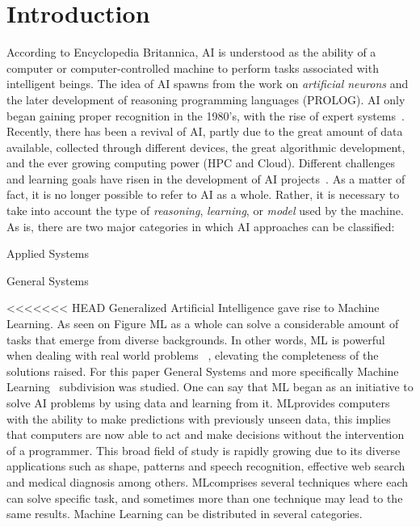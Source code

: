 
\section{Introduction}
\label{sec:introduction}

According to Encyclopedia Britannica, \ac{AI} is understood as the ability of a computer or 
computer-controlled machine to perform tasks associated with intelligent beings. The idea of 
\ac{AI} spawns from the work on \textit{artificial neurons} and the later development of reasoning 
programming languages (\eg PROLOG). \ac{AI} only began gaining proper recognition in the 
1980's, with the rise of expert systems~\cite{russel09}.  Recently, there has been a revival of 
\ac{AI}, partly due to the great amount of data available, collected through different devices, the 
great algorithmic development, and the ever growing computing power (\ie \ac{HPC} and Cloud). 
Different challenges and learning goals have risen in the development of \ac{AI} 
projects~\cite{russel09}. As a matter of fact, it is no longer possible to refer to \ac{AI} as a whole. 
Rather, it is necessary to take into account the type of \emph{reasoning}, \emph{learning}, or 
\emph{model} used by the machine. As is, there are two major categories in which \ac{AI} 
approaches can be classified:
\begin{enumerate*}[label=(\arabic*)]
\item Applied Systems
\item General Systems
\end{enumerate*}

<<<<<<< HEAD
Generalized Artificial Intelligence gave rise to Machine Learning. As seen on Figure  \ac{ML} as a whole can solve a considerable amount of tasks that emerge from diverse backgrounds. In other words, \ac{ML} is powerful when dealing with real world problems~\cite{michalski13} , elevating the completeness of the solutions raised. For this paper General Systems and more specifically Machine Learning~\cite{watkins92} subdivision was studied. One can say that \ac{ML} began as an initiative to solve AI problems by using data and learning from it. \ac{ML}provides computers with the ability to make predictions with previously unseen data, this implies that computers are now able to act and make decisions without the intervention of a programmer. This broad field of study is rapidly growing due to its diverse applications such as shape, patterns and speech recognition, effective web search and medical diagnosis among others. \ac{ML}comprises several techniques where each can solve specific task, and sometimes more than one technique may lead to the same results. Machine Learning can be distributed in several categories.

